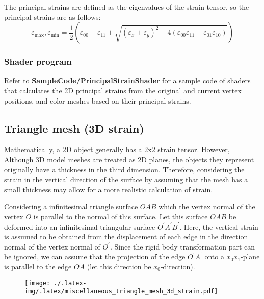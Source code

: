 \documentclass[]{article}
\theoremstyle{definition}
\begin{document}
The principal strains are defined as the eigenvalues of the strain tensor, so the principal strains are as follows:
\begin{equation}
    \varepsilon_{\mathrm{max}}, \varepsilon_{\mathrm{min}} = \frac{1}{2}\left(\varepsilon_{00} + \varepsilon_{11} \pm \sqrt{(\varepsilon_x + \varepsilon_y)^2 - 4(\varepsilon_{00}\varepsilon_{11}-\varepsilon_{01}\varepsilon_{10})}\right)    
\end{equation}

\subsubsection{Shader program}
Refer to \href{https://github.com/t-34400/PhysicsAndMathematics/tree/main/SampleCode/PrincipalStrainShader}{\textbf{SampleCode/PrincipalStrainShader}} for a sample code of shaders that calculates the 2D principal strains from the original and current vertex positions, and color meshes based on their principal strains.

\subsection{Triangle mesh (3D strain)}
Mathematically, a 2D object generally has a 2x2 strain tensor. 
However, Although 3D model meshes are treated as 2D planes, the objects they represent originally have a thickness in the third dimension. 
Therefore, considering the strain in the vertical direction of the surface by assuming that the mesh has a small thickness may allow for a more realistic calculation of strain.

Considering a infinitesimal triangle surface $OAB$ which the vertex normal of the vertex $O$ is parallel to the normal of this surface.
Let this surface $OAB$ be deformed into an infinitesimal triangular surface $O^\prime A^\prime B^\prime$.
Here, the vertical strain is assumed to be obtained from the displacement of each edge in the direction normal of the vertex normal of $O^\prime$.
Since the rigid body transformation part can be ignored, we can assume that the projection of the edge $O^\prime A^\prime$ onto a $x_0x_1$-plane is parallel to the edge $OA$ (let this direction be $x_0$-direction).
\begin{figure}[H]
    \centering
    \texttt{[image: ./.latex-img/.latex/miscellaneous\_triangle\_mesh\_3d\_strain.pdf]}
    \label{fig:infinitesimal_triangle_deformation_3d_strain}
\end{figure}
\end{document}
